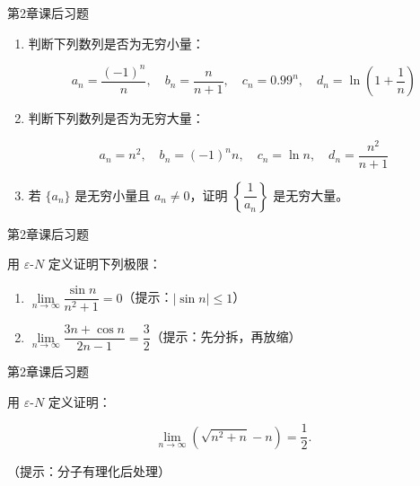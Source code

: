\documentclass[aspectratio=169,10pt,fontset=fandol]{ctexbeamer}
\begin{document}
\begin{frame}[t,fragile]{第2章课后习题}
\normalsize
{\normalsize
\begin{enumerate}

\item 判断下列数列是否为无穷小量：

   \[

   a_n = \dfrac{(-1)^n}{n},\quad b_n = \dfrac{n}{n+1},\quad c_n = 0.99^n,\quad d_n = \ln\left(1+\dfrac{1}{n}\right)

   \]

\item 判断下列数列是否为无穷大量：

   \[

   a_n = n^2,\quad b_n = (-1)^n n,\quad c_n = \ln n,\quad d_n = \dfrac{n^2}{n+1}

   \]

\item 若 \(\{a_n\}\) 是无穷小量且 \(a_n \neq 0\)，证明 \(\left\{\dfrac{1}{a_n}\right\}\) 是无穷大量。

\end{enumerate}


}
\end{frame}
\begin{frame}[t,fragile]{第2章课后习题}
\normalsize
{\normalsize
用 \(\varepsilon\)-\(N\) 定义证明下列极限：

\begin{enumerate}

\item \(\lim\limits_{n\to\infty} \dfrac{\sin n}{n^2 + 1} = 0\)（提示：\(|\sin n| \leq 1\)）

\item \(\lim\limits_{n\to\infty} \dfrac{3n + \cos n}{2n - 1} = \dfrac{3}{2}\)（提示：先分拆，再放缩）

\end{enumerate}


}
\end{frame}
\begin{frame}[t,fragile]{第2章课后习题}
\normalsize
{\normalsize
用 \(\varepsilon\)-\(N\) 定义证明：

\[

\lim_{n\to\infty} \left(\sqrt{n^2 + n} - n\right) = \dfrac{1}{2}.

\]

（提示：分子有理化后处理）


}
\end{frame}
\end{document}
